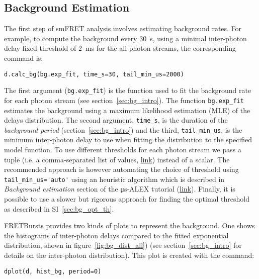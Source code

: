 \subsection{Background Estimation}
\label{sec:bg_calc}

The first step of smFRET analysis involves estimating background rates.
For example, to compute the background every 30~s, using a minimal inter-photon
delay fixed threshold of 2~ms for the all photon streams, the corresponding command is:

\begin{lstlisting}
d.calc_bg(bg.exp_fit, time_s=30, tail_min_us=2000)
\end{lstlisting}

The first argument (\verb|bg.exp_fit|) is the function used to fit the
background rate for each photon stream (see section~\ref{sec:bg_intro}).
The function
\verb|bg.exp_fit| estimates the background using a maximum likelihood estimation
(MLE) of the delays distribution.
The second argument, \verb|time_s|, is the duration of the
\textit{background period} (section~\ref{sec:bg_intro}) and the third, \verb|tail_min_us|,
is the minimum inter-photon delay to use when fitting the distribution to the specified model function.
To use different thresholds for each photon stream we pass a
tuple (i.e. a comma-separated list of values, \href{https://docs.python.org/3.5/tutorial/datastructures.html#tuples-and-sequences}{link}) instead of a scalar.
The recommended approach is however automating the choice of threshold using
\verb|tail_min_us='auto'| using an heuristic algorithm which is described in 
\textit{Background estimation} section of the μs-ALEX tutorial 
(\href{http://nbviewer.jupyter.org/github/tritemio/FRETBursts_notebooks/blob/master/notebooks/FRETBursts%20-%20us-ALEX%20smFRET%20burst%20analysis.ipynb#Background-estimation}{link}).
Finally, it is possible to use a slower but rigorous approach for finding the optimal
threshold as described in SI~\ref{sec:bg_opt_th}.

FRETBursts provides two kinds of plots to represent the background. One shows the histograms
of inter-photon delays compared to the fitted exponential distribution, shown in 
figure~\ref{fig:bg_dist_all}) (see section~\ref{sec:bg_intro} for details on the inter-photon distribution). 
This plot is created with the command:

\begin{lstlisting}
dplot(d, hist_bg, period=0)
\end{lstlisting}

